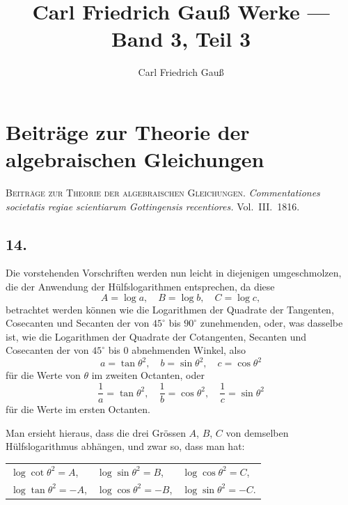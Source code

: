 \documentclass[12pt,a4paper]{article}
\title{Carl Friedrich Gauß Werke — Band 3, Teil 3}
\author{Carl Friedrich Gauß}
\date{}
\newcommand{\1}{\ensuremath{\mathrlap{\,|\,}}} %
\begin{document}
\maketitle
\thispagestyle{empty}
\tableofcontents
\newpage
\setcounter{page}{101}

\section*{Beiträge zur Theorie der algebraischen Gleichungen}

\noindent\textsc{Beiträge zur Theorie der algebraischen Gleichungen.}
\textit{Commentationes societatis regiae scientiarum Gottingensis recentiores.} Vol.~III.\ 1816.

\subsection*{14.}


Die vorstehenden Vorschriften werden nun leicht in diejenigen umgeschmolzen, die der Anwendung der Hülfslogarithmen entsprechen, da diese
\[A = \log a,\quad B = \log b,\quad C = \log c,\]
betrachtet werden können wie die Logarithmen der Quadrate der Tangenten, Cosecanten und Secanten der von $45^{\circ}$ bis $90^{\circ}$ zunehmenden, oder, was dasselbe ist, wie die Logarithmen der Quadrate der Cotangenten, Secanten und Cosecanten der von $45^{\circ}$ bis $0$ abnehmenden Winkel, also
\[a = \tan\theta^2,\quad b = \sin\theta^2,\quad c = \cos\theta^2\]
für die Werte von $\theta$ im zweiten Octanten, oder
\[\frac{1}{a} = \tan\theta^2,\quad \frac{1}{b} = \cos\theta^2,\quad \frac{1}{c} = \sin\theta^2\]
für die Werte im ersten Octanten.

Man ersieht hieraus, dass die drei Grössen $A$, $B$, $C$ von demselben Hülfslogarithmus abhängen, und zwar so, dass man hat:
\begin{center}
\begin{tabular}{lll}
$\log\cot\theta^2 = A$, & $\log\sin\theta^2 = B$, & $\log\cos\theta^2 = C$, \\
$\log\tan\theta^2 = -A$, & $\log\cos\theta^2 = -B$, & $\log\sin\theta^2 = -C$.
\end{tabular}
\end{center}
\end{document}
